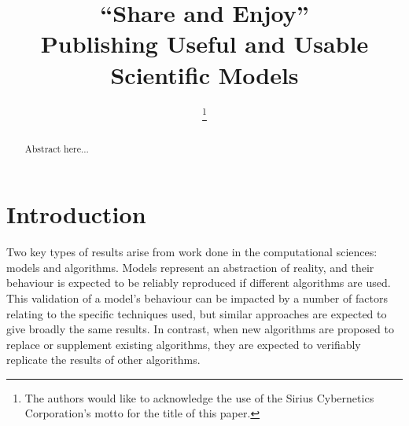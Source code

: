 \documentclass[conference]{IEEEtran}
\begin{document}

\title{``Share and Enjoy''\\Publishing Useful and Usable Scientific Models}

\author{
%
\thanks{The authors would like to acknowledge the use of the Sirius Cybernetics
  Corporation's motto for the title of this paper. }
\and
{}
}

\maketitle

\begin{abstract}
Abstract here...
\end{abstract}

\IEEEpeerreviewmaketitle

\section{Introduction}
Two key types of results arise from work done in the computational
sciences: models and algorithms. Models represent an abstraction of
reality, and their behaviour is expected to be reliably reproduced if
different algorithms are used. This validation of a model's behaviour
can be impacted by a number of factors relating to the specific
techniques used, but similar approaches are expected to give broadly
the same results.  In contrast, when new algorithms are proposed to
replace or supplement existing algorithms, they are expected to
verifiably replicate the results of other algorithms.
\end{document}
